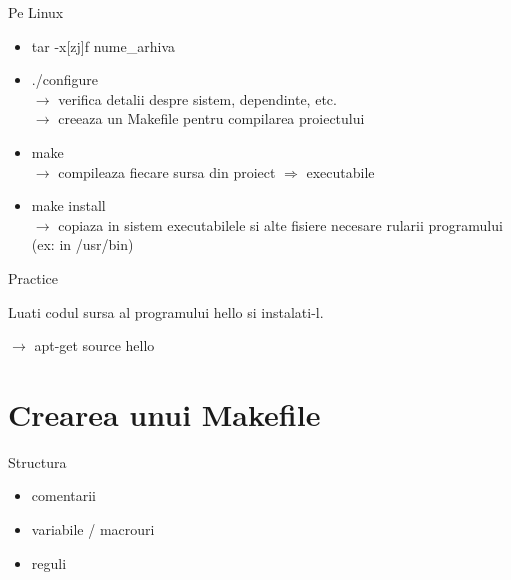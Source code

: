 \documentclass{beamer}
\begin{document}
    \begin{frame}{Pe Linux}
    \begin{itemize}
    \setlength{\itemsep}{0.7cm}
    \item {\ttfamily tar -x[zj]f nume\_arhiva}
    \item {\ttfamily ./configure}\\$\rightarrow$ verifica detalii despre sistem, dependinte, etc.\\$\rightarrow$ creeaza un Makefile pentru compilarea proiectului
    \item {\ttfamily make}\\$\rightarrow$ compileaza fiecare sursa din proiect $\Rightarrow$ executabile
    \item {\ttfamily make install}\\$\rightarrow$ copiaza in sistem executabilele si alte fisiere necesare rularii programului (ex: in {\ttfamily /usr/bin})
    \end{itemize}
    \end{frame}

    \begin{frame}{Practice}
    \par Luati codul sursa al programului hello si instalati-l.
    \vspace{0.6cm}
    \par $\rightarrow$ {\ttfamily apt-get source hello}
    \end{frame}

\section{Crearea unui Makefile}
    \frame{\tableofcontents[currentsection]}

    \begin{frame}{Structura}
    \begin{itemize}
    \setlength{\itemsep}{0.6cm}
    \item comentarii
    \item variabile / macrouri
    \item reguli
    \end{itemize}
    \end{frame}
\end{document}
